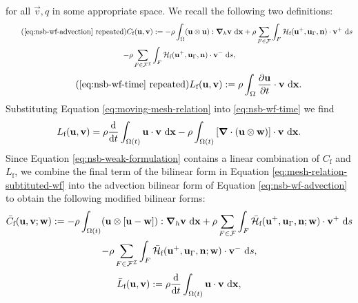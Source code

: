             for all $\vec{v}, q$ in some appropriate space. We recall the following two definitions:                
            \begin{multline}
                \retag{eq:nsb-wf-advection}
                C_\text{f}(\vec{u}, \vec{v}) := - \rho \int_{\Omega} (\vec{u} \otimes \vec{u}) : \vec{\nabla}_h \vec{v} \diff \vec{x} + \rho \sum_{F \in \mathcal{F}} \int_{F} \mathcal{H}_\text{f}(\vec{u}^+, \vec{u}_\Gamma, \vec{n}) \cdot \vec{v}^+ \diff s \\ - \rho \sum_{F \in \mathcal{F}^\mathcal{I}} \int_{F} \mathcal{H}_\text{f}(\vec{u}^+, \vec{u}_\Gamma, \vec{n}) \cdot \vec{v}^- \diff s,
            \end{multline}
            \begin{equation}
                \retag{eq:nsb-wf-time}
                L_\text{f}(\vec{u}, \vec{v}) := \rho \int_\Omega \pdv{\vec{u}}{t} \cdot \vec{v} \diff \vec{x}.
            \end{equation}
            Substituting Equation \eqref{eq:moving-mesh-relation} into \eqref{eq:nsb-wf-time} we find
            \begin{equation}
                L_\text{f}(\boldsymbol{\mathbf{u}}, \boldsymbol{\mathbf{v}}) = \rho \dv{}{t} \int_{\Omega(t)} \boldsymbol{\mathbf{u}} \cdot \boldsymbol{\mathbf{v}} ~\mathrm{d} \boldsymbol{\mathbf{x}} - \rho \int_{\Omega(t)} \left[ \boldsymbol{\mathbf{\nabla}} \cdot (\boldsymbol{\mathbf{u}} \otimes \boldsymbol{\mathbf{w}}) \right] \cdot \boldsymbol{\mathbf{v}} ~\mathrm{d} \boldsymbol{\mathbf{x}}.
                \label{eq:mesh-relation-subtituted-wf}
            \end{equation}
            Since Equation \eqref{eq:nsb-weak-formulation} contains a linear combination of $C_\text{f}$ and $L_\text{f}$, we combine the final term of the bilinear form in Equation \eqref{eq:mesh-relation-subtituted-wf} into the advection bilinear form of Equation \eqref{eq:nsb-wf-advection} to obtain the following modified bilinear forms:                
            \begin{multline}
                \label{eq:moving-mesh-advection-term}
                \bar{C}_\text{f}(\boldsymbol{\mathbf{u}}, \boldsymbol{\mathbf{v}}; \boldsymbol{\mathbf{w}}) := - \rho \int_{\Omega(t)} (\boldsymbol{\mathbf{u}} \otimes [\boldsymbol{\mathbf{u}} - \boldsymbol{\mathbf{w}}]) : \boldsymbol{\mathbf{\nabla}}_h \boldsymbol{\mathbf{v}} ~\mathrm{d} \boldsymbol{\mathbf{x}} + \rho \sum_{F \in \mathcal{F}} \int_{F} \bar{\mathcal{H}}_\text{f}(\boldsymbol{\mathbf{u}}^+, \boldsymbol{\mathbf{u}}_\Gamma, \boldsymbol{\mathbf{n}}; \boldsymbol{\mathbf{w}}) \cdot \boldsymbol{\mathbf{v}}^+ ~\mathrm{d} s \\ - \rho \sum_{F \in \mathcal{F}^\mathcal{I}} \int_{F} \bar{\mathcal{H}}_\text{f}(\boldsymbol{\mathbf{u}}^+, \boldsymbol{\mathbf{u}}_\Gamma, \boldsymbol{\mathbf{n}}; \boldsymbol{\mathbf{w}}) \cdot \boldsymbol{\mathbf{v}}^- ~\mathrm{d} s,
            \end{multline}
            \begin{equation}
                \label{eq:moving-mesh-time-term}
                \bar{L}_\text{f}(\boldsymbol{\mathbf{u}}, \boldsymbol{\mathbf{v}}) := \rho \dv{}{t} \int_{\Omega(t)} \boldsymbol{\mathbf{u}} \cdot \boldsymbol{\mathbf{v}} ~\mathrm{d} \boldsymbol{\mathbf{x}},
            \end{equation}
